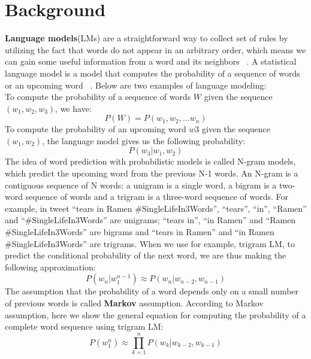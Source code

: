 \documentclass[11pt,a4paper]{article}
\begin{document}
\section{Background}
\textbf{Language models}(LMs) are a straightforward way to collect set of rules by utilizing the fact that words do not appear in an arbitrary order, which means we can gain some useful information from a word and its neighbors ~\cite{JM}. A statistical language model is a model that computes the probability of a sequence of words or an upcoming word ~\cite{JM}. Below are two examples of language modeling:\\
\indent To compute the probability of a sequence of words $W$ given the sequence $(w_{1},w_{2},w_{3})$, we have:
\begin{equation}
P(W) = P(w_{1},w_{2},...w_{n})
\end{equation}
\indent To compute the probability of an upcoming word $w3$ given the sequence $(w_{1},w_{2})$, the language model gives us the following probability:
\begin{equation}
P(w_{3}|w_{1},w_{2})
\end{equation}
\indent The idea of word prediction with probabilistic models is called N-gram models, which predict the upcoming word from the previous N-1 words. An N-gram is a contiguous sequence of N words: a unigram is a single word, a bigram is a two-word sequence of words and a trigram is a three-word sequence of words. For example, in tweet ``tears in Ramen \#SingleLifeIn3Words'', ``tears'', ``in'', ``Ramen'' and ``\#SingleLifeIn3Words'' are unigrams; ``tears in'', ``in Ramen'' and ``Ramen \#SingleLifeIn3Words'' are bigrams and ``tears in Ramen'' and ``in Ramen \#SingleLifeIn3Words'' are trigrams.
\indent  When we use for example, trigram LM, to predict the conditional probability of the next word, we are thus making the following approximation:
\begin{equation}
P(w_n|w_1^{n-1})\approx P(w_n|w_{n-2}, w_{n-1})
\end{equation}
\indent The assumption that the probability of a word depends only on a small number of previous words is called \textbf{Markov} assumption. According to Markov assumption, here we show the general equation for computing the probability of a complete word sequence using trigram LM:
\begin{equation}
P(w_1^n)\approx \prod_{k=1}^{n} P(w_k|w_{k-2}, w_{k-1})
\end{equation}\\
\end{document}
